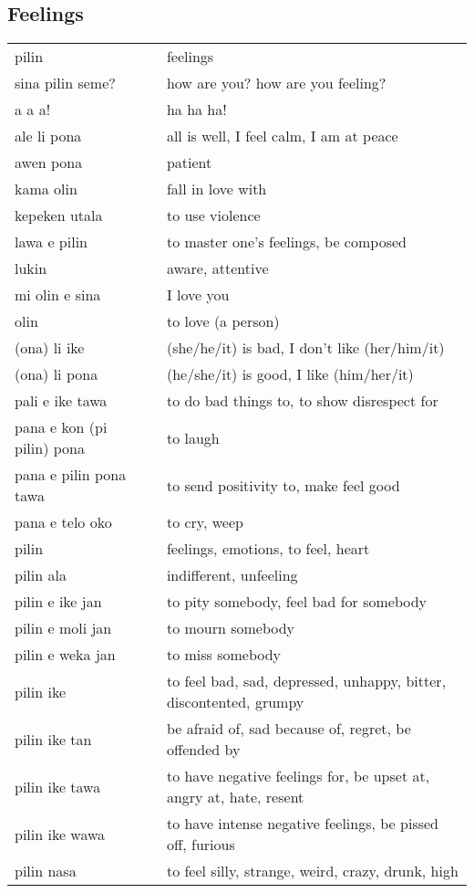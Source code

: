 \subsection{Feelings}
%
\begin{supertabular}{p{4,5cm}|ll}
pilin && feelings \\
sina pilin seme? && how are you? how are you feeling? \\
a a a! && ha ha ha! \\
ale li pona && all is well, I feel calm, I am at peace \\
awen pona && patient \\
kama olin && fall in love with \\
kepeken utala && to use violence \\
lawa e pilin && to master one's feelings, be composed \\ 
lukin && aware, attentive \\
mi olin e sina && I love you \\
olin && to love (a person) \\
(ona) li ike && (she/he/it) is bad, I don't like (her/him/it) \\
(ona) li pona && (he/she/it) is good, I like (him/her/it) \\
pali e ike tawa && to do bad things to, to show disrespect for \\
pana e kon (pi pilin) pona && to laugh \\
pana e pilin pona tawa && to send positivity to, make feel good \\
pana e telo oko && to cry, weep \\
pilin && feelings, emotions, to feel, heart \\
pilin ala && indifferent, unfeeling \\
pilin e ike jan && to pity somebody, feel bad for somebody \\
pilin e moli jan && to mourn somebody \\
pilin e weka jan && to miss somebody \\
pilin ike && to feel bad, sad, depressed, unhappy, bitter, discontented, grumpy \\
pilin ike tan && be afraid of, sad because of, regret, be offended by \\
pilin ike tawa && to have negative feelings for, be upset at, angry at, hate, resent \\
pilin ike wawa && to have intense negative feelings, be pissed off, furious \\
pilin nasa && to feel silly, strange, weird, crazy, drunk, high \\ 

\end{supertabular}
